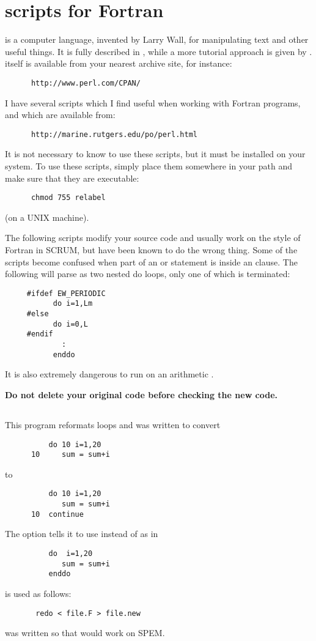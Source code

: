 \section{ scripts for Fortran}
\label{Perl}
 is a computer language, invented by Larry Wall, for
manipulating text and other useful things.  It is fully described in
\cite{perl1}, while a more tutorial approach is given
by \cite{perl2}.   itself is available from your
nearest  archive site, for instance:
\begin{verbatim}
      http://www.perl.com/CPAN/
\end{verbatim}

I have several  scripts which I find useful when working
with Fortran programs, and which are available from:
\begin{verbatim}
      http://marine.rutgers.edu/po/perl.html
\end{verbatim}
It is not necessary to know  to
use these scripts, but it must be installed on your system.  To use
these scripts, simply place them somewhere in your path and make sure
that they are executable:
\begin{verbatim}
      chmod 755 relabel
\end{verbatim}
(on a UNIX machine).

The following scripts modify your source code and usually work on the
style of Fortran in SCRUM, but have been known to do the wrong thing.
Some of the scripts become confused when part of an  or
 statement is inside an  clause.  The following
will parse as two nested do loops, only one of which is terminated:
\begin{verbatim}
     #ifdef EW_PERIODIC
           do i=1,Lm
     #else
           do i=0,L
     #endif
             :
           enddo
\end{verbatim}
It is also extremely dangerous to run  on an arithmetic
.

{\bf Do not delete your original code before checking the new code.}

\subsection{}
This program reformats  loops and was written to convert
\begin{verbatim}
          do 10 i=1,20
      10     sum = sum+i
\end{verbatim}
to
\begin{verbatim}
          do 10 i=1,20
             sum = sum+i
      10  continue
\end{verbatim}
The  option tells it to use  instead of
 as in
\begin{verbatim}
          do  i=1,20
             sum = sum+i
          enddo
\end{verbatim}
 is used as follows:
\begin{verbatim}
       redo < file.F > file.new
\end{verbatim}
 was written so that  would work on SPEM.

